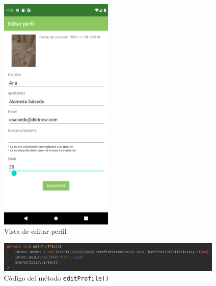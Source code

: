\begin{figure}[H]
    \centering
    \includegraphics[width=0.5\textwidth]{Images/Capitulo7/editarperf.png}
    \caption{Vista de editar perfil}
    \label{fig:editarperf}
\end{figure}
\begin{figure}[H]
    \centering
    \includegraphics[width=\textwidth]{Images/Capitulo7/editprofilecode.png}
    \caption{Código del método \texttt{editProfile()}}
    \label{fig:editprofilecode}
\end{figure}

